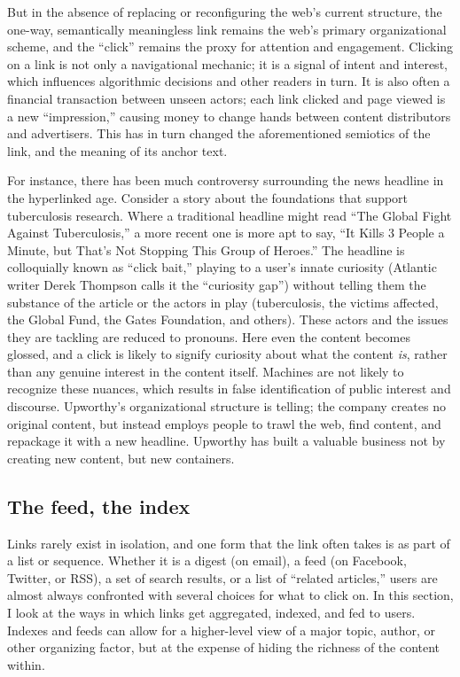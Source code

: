 But in the absence of replacing or reconfiguring the web's current structure, the one-way, semantically meaningless link remains the web's primary organizational scheme, and the ``click'' remains the proxy for attention and engagement. Clicking on a link is not only a navigational mechanic; it is a signal of intent and interest, which influences algorithmic decisions and other readers in turn. It is also often a financial transaction between unseen actors; each link clicked and page viewed is a new ``impression,'' causing money to change hands between content distributors and advertisers. This has in turn changed the aforementioned semiotics of the link, and the meaning of its anchor text.

For instance, there has been much controversy surrounding the news headline in the hyperlinked age. Consider a story about the foundations that support tuberculosis research. Where a traditional headline might read ``The Global Fight Against Tuberculosis,'' a more recent one is more apt to say, ``It Kills 3 People a Minute, but That's Not Stopping This Group of Heroes.''\autocite{karsch_it_2014} The headline is colloquially known as ``click bait,'' playing to a user's innate curiosity (Atlantic writer Derek Thompson calls it the ``curiosity gap'')\autocite{thompson_upworthy:_2013} without telling them the substance of the article or the actors in play (tuberculosis, the victims affected, the Global Fund, the Gates Foundation, and others). These actors and the issues they are tackling are reduced to pronouns. Here even the content becomes glossed, and a click is likely to signify curiosity about what the content \emph{is}, rather than any genuine interest in the content itself. Machines are not likely to recognize these nuances, which results in false identification of public interest and discourse. Upworthy's organizational structure is telling; the company creates no original content, but instead employs people to trawl the web, find content, and repackage it with a new headline. Upworthy has built a valuable business not by creating new content, but new containers.

\subsection{The feed, the index}

Links rarely exist in isolation, and one form that the link often takes is as part of a list or sequence. Whether it is a digest (on email), a feed (on Facebook, Twitter, or RSS), a set of search results, or a list of ``related articles,'' users are almost always confronted with several choices for what to click on. In this section, I look at the ways in which links get aggregated, indexed, and fed to users. Indexes and feeds can allow for a higher-level view of a major topic, author, or other organizing factor, but at the expense of hiding the richness of the content within.

